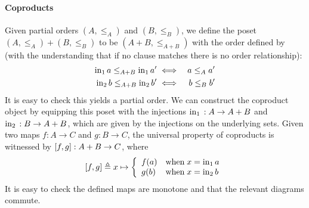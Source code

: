 \paragraph{Coproducts} Given partial orders $(A, \leq_A)$ and $(B, \leq_B)$,
we define the poset $(A , \leq_A) + (B, \leq_B)$ to be $(A + B, \leq_{A + B})$ with
the order defined by (with the understanding that if no clause matches there is
no order relationship):
%
\begin{eqnarray*}
  \mathrm{in}_{1}\, a \leq_{A+B} \mathrm{in}_{1}\, a' & \iff & a \leq_A a' \\
  \mathrm{in}_{2}\, b \leq_{A+B} \mathrm{in}_{2}\, b' & \iff & b \leq_B b'
\end{eqnarray*}
%
It is easy to check this yields a partial order. We can construct the coproduct
object by equipping this poset with the injections $\mathrm{in}_{1}\, {} : A \to A + B$
and $\mathrm{in}_{2}\, {} : B \to A + B$, which are given by the injections on the underlying
sets.
%
Given two maps $f : A \to C$ and $g : B \to C$, the universal property
of coproducts is witnessed by $[{f,g}] : A + B \to C$, where
\begin{displaymath}
  [{f, g}] \triangleq x \mapsto \left\{\begin{array}{ll}
                                            f(a) & \mbox{when}\;x = \mathrm{in}_{1}\, a \\
                                            g(b) & \mbox{when}\;x = \mathrm{in}_{2}\, b
                                          \end{array}
                                        \right.
\end{displaymath}
It is easy to check the defined maps are monotone and that the relevant diagrams commute.
